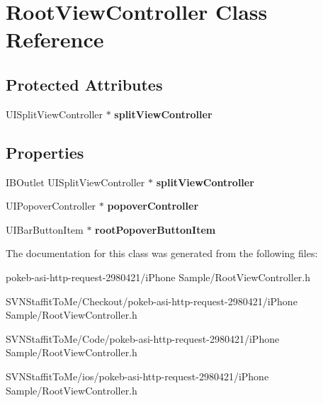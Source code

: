 \hypertarget{interface_root_view_controller}{
\section{\-Root\-View\-Controller \-Class \-Reference}
\label{interface_root_view_controller}
}
\subsection*{\-Protected \-Attributes}
\begin{DoxyCompactItemize}
\item 
\hypertarget{interface_root_view_controller_a62accb7d6fe1f664234c21c8b2257fa5}{
\-U\-I\-Split\-View\-Controller $\ast$ {\bfseries split\-View\-Controller}}
\label{interface_root_view_controller_a62accb7d6fe1f664234c21c8b2257fa5}

\end{DoxyCompactItemize}
\subsection*{\-Properties}
\begin{DoxyCompactItemize}
\item 
\hypertarget{interface_root_view_controller_a35947d6f5347186c29c1740d63b2f0a7}{
\-I\-B\-Outlet \-U\-I\-Split\-View\-Controller $\ast$ {\bfseries split\-View\-Controller}}
\label{interface_root_view_controller_a35947d6f5347186c29c1740d63b2f0a7}

\item 
\hypertarget{interface_root_view_controller_a12a4ab177c6d453f5644336f24c3eeeb}{
\-U\-I\-Popover\-Controller $\ast$ {\bfseries popover\-Controller}}
\label{interface_root_view_controller_a12a4ab177c6d453f5644336f24c3eeeb}

\item 
\hypertarget{interface_root_view_controller_ab9efd15c0a02a754100279a92d7d6e17}{
\-U\-I\-Bar\-Button\-Item $\ast$ {\bfseries root\-Popover\-Button\-Item}}
\label{interface_root_view_controller_ab9efd15c0a02a754100279a92d7d6e17}

\end{DoxyCompactItemize}


\-The documentation for this class was generated from the following files\-:\begin{DoxyCompactItemize}
\item 
pokeb-\/asi-\/http-\/request-\/2980421/i\-Phone Sample/\-Root\-View\-Controller.\-h\item 
\-S\-V\-N\-Staffit\-To\-Me/\-Checkout/pokeb-\/asi-\/http-\/request-\/2980421/i\-Phone Sample/\-Root\-View\-Controller.\-h\item 
\-S\-V\-N\-Staffit\-To\-Me/\-Code/pokeb-\/asi-\/http-\/request-\/2980421/i\-Phone Sample/\-Root\-View\-Controller.\-h\item 
\-S\-V\-N\-Staffit\-To\-Me/ios/pokeb-\/asi-\/http-\/request-\/2980421/i\-Phone Sample/\-Root\-View\-Controller.\-h\end{DoxyCompactItemize}
